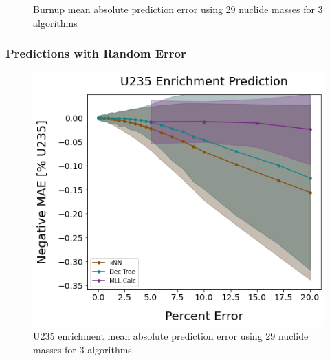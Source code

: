\begin{frame}
\begin{adjustwidth}{-15pt}{0pt}
\begin{minipage}{0.5\textwidth}
\begin{figure}
      \caption{Burnup mean absolute prediction error using 29 nuclide masses for 3 algorithms}
    \end{figure}
  \end{minipage}
  \end{adjustwidth}
\end{frame}

\begin{frame}
  \frametitle{Predictions with Random Error}
  \begin{adjustwidth}{-15pt}{0pt}
  \begin{minipage}{0.5\textwidth}
    \begin{figure}
      \centering
      \includegraphics[width=1.08\linewidth]{./figures/randerr_compare_nuc29_enri.png}
      \caption{U235 enrichment mean absolute prediction error using 29 nuclide masses for 3 algorithms}
    \end{figure}
  \end{minipage}%
  \hfill
  \begin{minipage}{0.5\textwidth}
    \begin{figure}
      \centering

\end{figure}
\end{minipage}
\end{adjustwidth}
\end{frame}
